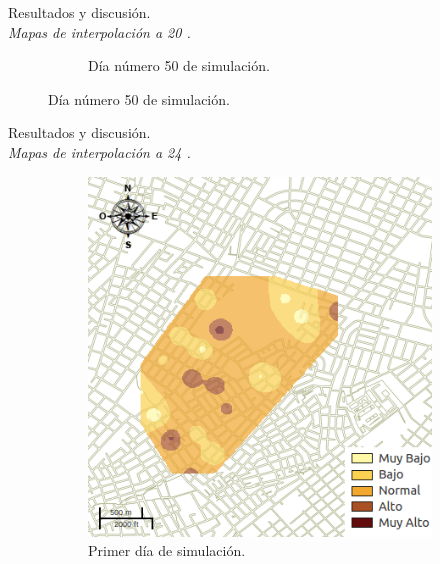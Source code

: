 \begin{frame}[t]{Resultados y discusión.\\\textit{Mapas de interpolación a 20 \textcelsius.}}
\begin{figure}
\begin{subfigure}[b]{0.45\textwidth}
        \caption{Día número 50 de simulación.}
    \end{subfigure}
    \end{figure}
\end{frame}

\begin{frame}[t]{Resultados y discusión.\\\textit{Mapas de interpolación a 24 \textcelsius.}}
    \begin{figure}
    \begin{subfigure}[b]{0.45\textwidth}
        \includegraphics[width=\textwidth]{./graphics/inicial.png}
        \caption{ Primer día de simulación.}
    \end{subfigure}
    ~~~~
    \begin{subfigure}[b]{0.45\textwidth}

\end{subfigure}
\end{figure}
\end{frame}
